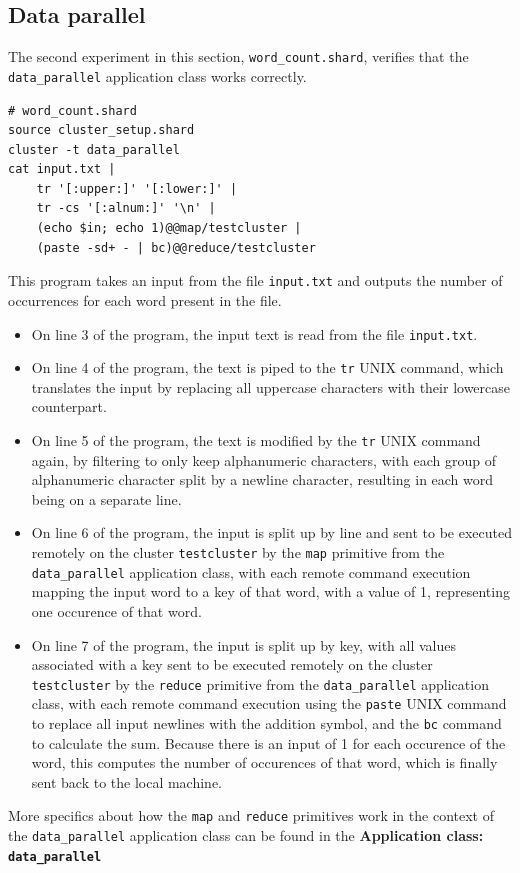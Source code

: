 \documentclass[twoside]{report}
\newcommand{\todoi}[1]{\todo[inline, color=blue!20]{TODO: {#1}}}
\begin{document}
\todoi{Some analysis on the actual results}

\subsection{Data parallel}
The second experiment in this section, \texttt{word\_count.shard}, verifies that the \texttt{data\_parallel} application class works correctly.
\begin{lstlisting}[language=Shard]
# word_count.shard
source cluster_setup.shard
cluster -t data_parallel
cat input.txt |
    tr '[:upper:]' '[:lower:]' |
    tr -cs '[:alnum:]' '\n' |
    (echo $in; echo 1)@@map/testcluster |
    (paste -sd+ - | bc)@@reduce/testcluster
\end{lstlisting}
This program takes an input from the file \texttt{input.txt} and outputs the number of occurrences for each word present in the file.
\begin{itemize}
  \item
        On line 3 of the program, the input text is read from the file \texttt{input.txt}.
  \item
        On line 4 of the program, the text is piped to the \texttt{tr} UNIX command, which translates the input by replacing all uppercase characters with their lowercase counterpart.
  \item
        On line 5 of the program, the text is modified by the \texttt{tr} UNIX command again, by filtering to only keep alphanumeric characters, with each group of alphanumeric character split by a newline character, resulting in each word being on a separate line.
  \item
        On line 6 of the program, the input is split up by line and sent to be executed remotely on the cluster \texttt{testcluster} by the \texttt{map} primitive from the \texttt{data\_parallel} application class, with each remote command execution mapping the input word to a key of that word, with a value of 1, representing one occurence of that word.
  \item
        On line 7 of the program, the input is split up by key, with all values associated with a key sent to be executed remotely on the cluster \texttt{testcluster} by the \texttt{reduce} primitive from the \texttt{data\_parallel} application class, with each remote command execution using the \texttt{paste} UNIX command to replace all input newlines with the addition symbol, and the \texttt{bc} command to calculate the sum.
        Because there is an input of 1 for each occurence of the word, this computes the number of occurences of that word, which is finally sent back to the local machine.
\end{itemize}
More specifics about how the \texttt{map} and \texttt{reduce} primitives work in the context of the \texttt{data\_parallel} application class can be found in the \textbf{Application class: \texttt{data\_parallel}}
\end{document}

